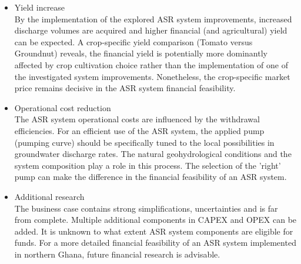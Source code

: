 \begin{itemize}
\item{Yield increase} \\
By the implementation of the explored ASR system improvements, increased discharge volumes are acquired and higher financial (and agricultural) yield can be expected. A crop-specific yield comparison (Tomato versus Groundnut) reveals, the financial yield is potentially more dominantly affected by crop cultivation choice rather than the implementation of one of the investigated system improvements. Nonetheless, the crop-specific market price remains decisive in the ASR system financial feasibility.  



\item{Operational cost reduction} \\
The ASR system operational costs are influenced by the withdrawal efficiencies. For an efficient use of the ASR system, the applied pump (pumping curve) should be specifically tuned to the local possibilities in groundwater discharge rates. The natural geohydrological conditions and the system composition play a role in this process. The selection of the 'right' pump can make the difference in the financial feasibility of an ASR system. 


\item{Additional research} \\
The business case contains strong simplifications, uncertainties and is far from complete. Multiple additional components in CAPEX and OPEX can be added. It is unknown to what extent ASR system components are eligible for funds. For a more detailed financial feasibility of an ASR system implemented in northern Ghana, future financial research is advisable. \\ 
\end{itemize}


